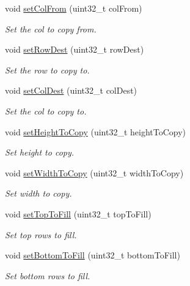 \begin{DoxyCompactItemize}
void \hyperlink{classfi_1_1HTGSTileRequestData_a25b7f6ea056b97f363fed4c47bc49434}{set\+Col\+From} (uint32\+\_\+t col\+From)
\begin{DoxyCompactList}\small\item\em Set the col to copy from. \end{DoxyCompactList}\item 
void \hyperlink{classfi_1_1HTGSTileRequestData_aea752262298f85b03aed2c0e27c35cec}{set\+Row\+Dest} (uint32\+\_\+t row\+Dest)
\begin{DoxyCompactList}\small\item\em Set the row to copy to. \end{DoxyCompactList}\item 
void \hyperlink{classfi_1_1HTGSTileRequestData_aeb334e3f9a4f4fbef1a497c01bb32d76}{set\+Col\+Dest} (uint32\+\_\+t col\+Dest)
\begin{DoxyCompactList}\small\item\em Set the col to copy to. \end{DoxyCompactList}\item 
void \hyperlink{classfi_1_1HTGSTileRequestData_adbfdb22563f32bd615faebf5674327fd}{set\+Height\+To\+Copy} (uint32\+\_\+t height\+To\+Copy)
\begin{DoxyCompactList}\small\item\em Set height to copy. \end{DoxyCompactList}\item 
void \hyperlink{classfi_1_1HTGSTileRequestData_a17c56732d4c5d109289a4447f8b64861}{set\+Width\+To\+Copy} (uint32\+\_\+t width\+To\+Copy)
\begin{DoxyCompactList}\small\item\em Set width to copy. \end{DoxyCompactList}\item 
void \hyperlink{classfi_1_1HTGSTileRequestData_a5852acce6bcabefdd82db8ac337ef2d0}{set\+Top\+To\+Fill} (uint32\+\_\+t top\+To\+Fill)
\begin{DoxyCompactList}\small\item\em Set top rows to fill. \end{DoxyCompactList}\item 
void \hyperlink{classfi_1_1HTGSTileRequestData_a5b862012e40006c84b2a4ec6bc1890a3}{set\+Bottom\+To\+Fill} (uint32\+\_\+t bottom\+To\+Fill)
\begin{DoxyCompactList}\small\item\em Set bottom rows to fill. \end{DoxyCompactList}\item 

\end{DoxyCompactItemize}
